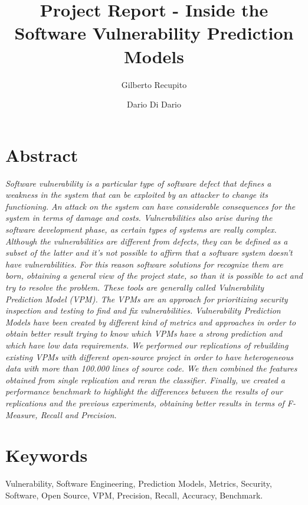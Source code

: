 \documentclass[twocolumn,10pt]{asme2ej}
\title{Project Report - Inside the Software Vulnerability Prediction Models}
\author{Gilberto Recupito
    \affiliation{
	Università di Salerno \\
    Email: g.recupito@studenti.unisa.it
    }	
}
\author{Dario Di Dario
    \affiliation{	Università degli Studi di Salerno \\
    	Email: d.didario@studenti.unisa.it
    }
}
\begin{document}
\maketitle    

\section*{Abstract}
{\textit{Software vulnerability is a particular type of software defect that defines a weakness in the system that can be exploited by an attacker to change its functioning.
An attack on the system can have considerable consequences for the system in terms of damage and costs.
Vulnerabilities also arise during the software development phase, as certain types of systems are really complex.
Although the vulnerabilities are different from defects, they can be defined as a subset of the latter and it’s not possible to affirm that a software system doesn’t have vulnerabilities.
For this reason software solutions for recognize them are born, obtaining a general view of the project state, so than it is possible to act and try to resolve the problem.
These tools are generally called Vulnerability Prediction Model (VPM). 
The VPMs are an approach for prioritizing security inspection and testing to find and fix vulnerabilities. Vulnerability Prediction Models have been created by different kind of metrics and approaches in order to obtain better result trying to know which VPMs have a strong prediction and which have low data requirements.
We performed our replications of rebuilding existing VPMs with different open-source project in order to have heterogeneous data with more than 100.000 lines of source code. We then combined the features obtained from single replication and reran the classifier. Finally, we created a performance benchmark to highlight the differences between the results of our replications and the previous experiments, obtaining better results in terms of F-Measure, Recall and Precision.
}  


}


\section*{Keywords}
Vulnerability, Software Engineering, Prediction Models, Metrics, Security, Software, Open Source, VPM, Precision, Recall, Accuracy, Benchmark.
\end{document}
